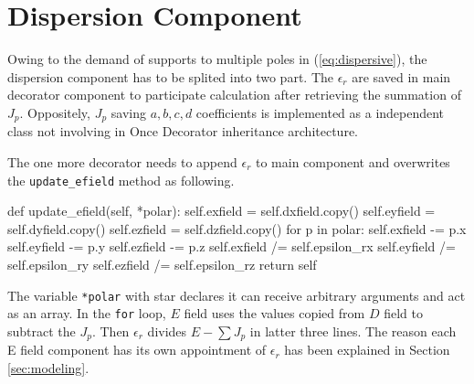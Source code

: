 \section{Dispersion Component}
Owing to the demand of supports to multiple poles in (\ref{eq:dispersive}), the dispersion component has to be splited
into two part. The $\epsilon_r$ are saved in main decorator component to participate calculation after retrieving the
summation of $J_p$. Oppositely, $J_p$ saving $a,b,c,d$ coefficients is implemented as a independent class not involving
in Once Decorator inheritance architecture.

The one more decorator needs to append $\epsilon_r$ to main component and overwrites the \texttt{update\_efield} method
as following.
\begin{code}
    def update_efield(self, *polar):
        self.exfield  = self.dxfield.copy()
        self.eyfield  = self.dyfield.copy()
        self.ezfield  = self.dzfield.copy()
        for p in polar:
            self.exfield -= p.x
            self.eyfield -= p.y
            self.ezfield -= p.z
        self.exfield /= self.epsilon_rx
        self.eyfield /= self.epsilon_ry
        self.ezfield /= self.epsilon_rz
        return self
\end{code}
The variable \texttt{*polar} with star declares it can receive arbitrary arguments and act as an array. In the
\texttt{for} loop, $E$ field uses the values copied from $D$ field to subtract the $J_p$. Then $\epsilon_r$ divides $E -
\sum J_p$ in latter three lines. The reason each E field component has its own appointment of $\epsilon_{r}$ has been
explained in Section \ref{sec:modeling}.

